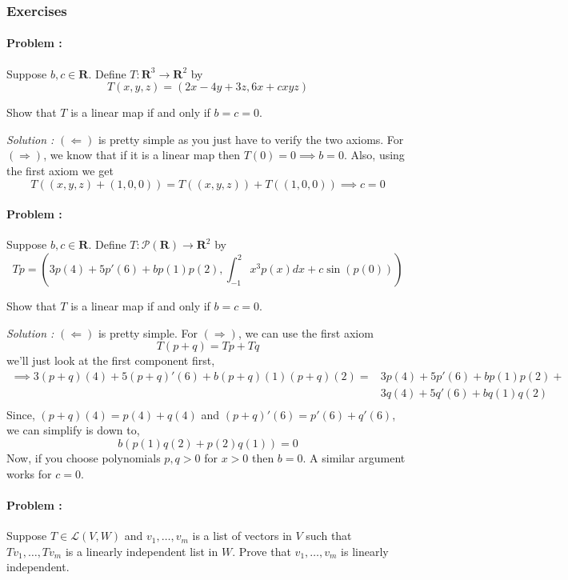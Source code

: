 \eject

\subsubsection{Exercises}


\paragraph{Problem :} Suppose $b,c \in \mathbf{R}$. Define $T : \mathbf{R}^3 \to \mathbf{R}^2$ by
\[ T(x,y,z)=(2x-4y+3z,6x+cxyz) \]

Show that $T$ is a linear map if and only if $b=c=0$.

\vspace{4mm}
\textit{Solution :} $(\Leftarrow)$ is pretty simple as you just have to verify the two axioms. For $(\Rightarrow)$, we know that
if it is a linear map then $T(0)=0 \implies b=0$. Also, using the first axiom we get
\[ T((x,y,z)+(1,0,0))=T((x,y,z))+T((1,0,0)) \implies c=0 \]

\paragraph{Problem :} Suppose $b,c \in \mathbf{R}$. Define $T : \mathcal{P}(\mathbf{R}) \to \mathbf{R}^2$ by
\[ Tp = \left( 3p(4)+5p'(6)+bp(1)p(2), \int_{-1}^{2} x^3 p (x) dx + c \sin(p(0)) \right) \]

Show that $T$ is a linear map if and only if $b=c=0$.

\vspace{4mm}
\textit{Solution :} $(\Leftarrow)$ is pretty simple. For $(\Rightarrow)$, we can use the first axiom
\[ T(p+q) = Tp + Tq\]
we'll just look at the first component first,
\begin{align*}
    \implies 3(p+q)(4) + 5(p+q)'(6)+ b(p+q)(1)(p+q)(2) = & 3p(4)+5p'(6)+  bp(1)p(2)  + \\ 
    & 3q(4)+5q'(6)+bq(1)q(2) \\
\end{align*}
Since, $(p+q)(4)=p(4)+q(4)$ and $(p+q)'(6)= p'(6) + q'(6)$, we can simplify is down to,
\[ b(p(1)q(2)+p(2)q(1))=0 \]
Now, if you choose polynomials $p,q > 0$ for $x>0$ then $b=0$. A similar argument works for $c=0$.

\paragraph{Problem :} Suppose $T \in \mathcal{L}(V, W)$ and $v_1,\ldots, v_m$ is a list of vectors in $V$ such that
$Tv_1 ,\ldots, Tv_m$ is a linearly independent list in $W$. Prove that $v_1 , \ldots, v_m$ is
linearly independent.

